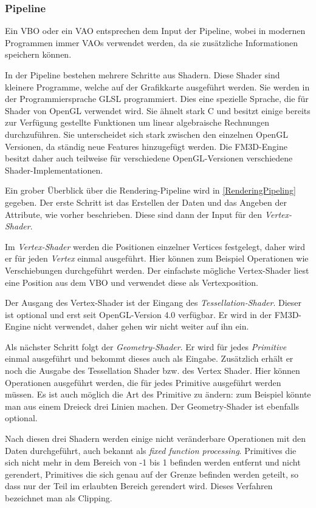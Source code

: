 \subsubsection{Pipeline\cite{Pipeline}}
Ein \ac{VBO} oder ein \ac{VAO} entsprechen dem Input der Pipeline, wobei in modernen Programmen immer \acp{VAO} verwendet werden, da sie zusätzliche Informationen speichern können.

In der Pipeline bestehen mehrere Schritte aus Shadern. Diese Shader sind kleinere Programme, welche auf der Grafikkarte ausgeführt werden. Sie werden in der Programmiersprache GLSL programmiert. Dies eine spezielle Sprache, die für Shader von OpenGL verwendet wird. Sie ähnelt stark C und besitzt einige bereits zur Verfügung gestellte Funktionen um linear algebraische Rechnungen durchzuführen. Sie unterscheidet sich stark zwischen den einzelnen OpenGL Versionen, da ständig neue Features hinzugefügt werden. Die FM3D-Engine besitzt daher auch teilweise für verschiedene OpenGL-Versionen verschiedene Shader-Implementationen.

Ein grober Überblick über die Rendering-Pipeline wird in \cref{RenderingPipeling} gegeben. Der erste Schritt ist das Erstellen der Daten und das Angeben der Attribute, wie vorher beschrieben. Diese sind dann der Input für den \textit{Vertex-Shader}. 

Im \textit{Vertex-Shader} werden die Positionen einzelner Vertices festgelegt, daher wird er für jeden \textit{Vertex} einmal ausgeführt. Hier können zum Beispiel Operationen wie Verschiebungen durchgeführt werden. Der einfachste mögliche Vertex-Shader liest eine Position aus dem \ac{VBO} und verwendet diese als Vertexposition. 

Der Ausgang des Vertex-Shader ist der Eingang des \textit{Tessellation-Shader}. Dieser ist optional und erst seit OpenGL-Version 4.0 verfügbar. Er wird in der FM3D-Engine nicht verwendet, daher gehen wir nicht weiter auf ihn ein. 

Als nächster Schritt folgt der \textit{Geometry-Shader}. Er wird für jedes \textit{Primitive} einmal ausgeführt und bekommt dieses auch als Eingabe. Zusätzlich erhält er noch die Ausgabe des Tessellation Shader bzw. des Vertex Shader. Hier können Operationen ausgeführt werden, die für jedes Primitive ausgeführt werden müssen. Es ist auch möglich die Art des Primitive zu ändern: zum Beispiel könnte man aus einem Dreieck drei Linien machen. Der Geometry-Shader ist ebenfalls optional.

Nach diesen drei Shadern werden einige nicht veränderbare Operationen mit den Daten durchgeführt, auch bekannt als \textit{fixed function processing}. Primitives die sich nicht mehr in dem Bereich von -1 bis 1 befinden werden entfernt und nicht gerendert, Primitives die sich genau auf der Grenze befinden werden geteilt, so dass nur der Teil im erlaubten Bereich gerendert wird. Dieses Verfahren bezeichnet man als Clipping.

